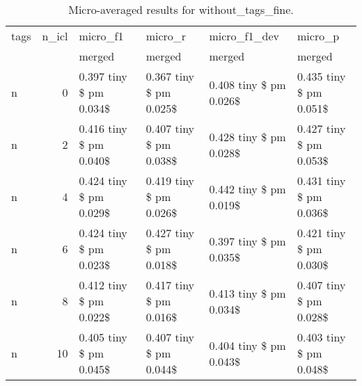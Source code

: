 \begin{table}
\caption{Micro-averaged results for without_tags_fine.}
\label{results_micro}
\begin{tabular}{lrllll}
\toprule
tags & n\_icl & micro\_f1 & micro\_r & micro\_f1\_dev & micro\_p \\
 &  & merged & merged & merged & merged \\
\midrule
n & 0 & 0.397 tiny \$ pm 0.034\$ & 0.367 tiny \$ pm 0.025\$ & 0.408 tiny \$ pm 0.026\$ & 0.435 tiny \$ pm 0.051\$ \\
n & 2 & 0.416 tiny \$ pm 0.040\$ & 0.407 tiny \$ pm 0.038\$ & 0.428 tiny \$ pm 0.028\$ & 0.427 tiny \$ pm 0.053\$ \\
n & 4 & 0.424 tiny \$ pm 0.029\$ & 0.419 tiny \$ pm 0.026\$ & 0.442 tiny \$ pm 0.019\$ & 0.431 tiny \$ pm 0.036\$ \\
n & 6 & 0.424 tiny \$ pm 0.023\$ & 0.427 tiny \$ pm 0.018\$ & 0.397 tiny \$ pm 0.035\$ & 0.421 tiny \$ pm 0.030\$ \\
n & 8 & 0.412 tiny \$ pm 0.022\$ & 0.417 tiny \$ pm 0.016\$ & 0.413 tiny \$ pm 0.034\$ & 0.407 tiny \$ pm 0.028\$ \\
n & 10 & 0.405 tiny \$ pm 0.045\$ & 0.407 tiny \$ pm 0.044\$ & 0.404 tiny \$ pm 0.043\$ & 0.403 tiny \$ pm 0.048\$ \\
\bottomrule
\end{tabular}
\end{table}
